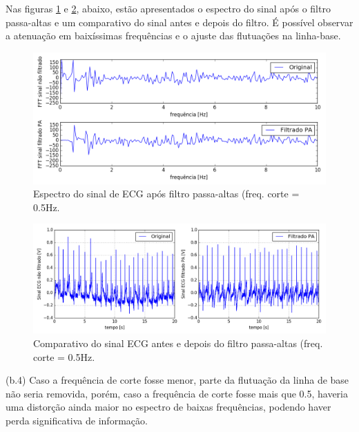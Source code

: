 \documentclass[12pt,letterpaper]{article}
\begin{document}
\begin{enumerate}[label=(\alph*)]
\begin{table}[H]
\begin{tabular}{lllll}
    \end{tabular}
    \end{table}

    Nas figuras \ref{fig:10} e \ref{fig:11}, abaixo, estão apresentados o espectro do sinal após o filtro passa-altas e um comparativo do sinal antes e depois do filtro. É possível observar a atenuação em baixíssimas frequências e o ajuste das flutuações na linha-base.
    
        \begin{figure}[H]
            \centering
            \includegraphics[width=15cm]{TC1/images/Q2_b_espectro_filt_PA_comparativo.png}
            \caption{Espectro do sinal de ECG após filtro passa-altas (freq. corte = 0.5Hz.}
            \label{fig:10}
        \end{figure}
    
        \begin{figure}[H]
            \centering
            \includegraphics[width=15cm]{TC1/images/Q2_b_sinal_filt_PA.png}
            \caption{Comparativo do sinal ECG antes e depois do filtro passa-altas (freq. corte = 0.5Hz.}
            \label{fig:11}
        \end{figure}
    
\newpage
    (b.4) Caso a frequência de corte fosse menor, parte da flutuação da linha de base não seria removida, porém, caso a frequência de corte fosse mais que 0.5, haveria uma distorção ainda maior no espectro de baixas frequências, podendo haver perda significativa de informação.
    

\end{enumerate}
\end{document}
